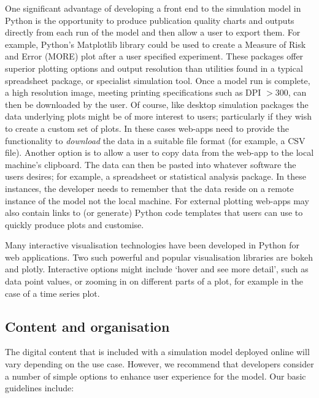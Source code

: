 \documentclass{swpaperproc}
\theoremstyle{sw}
\begin{document}
One significant advantage of developing a front end to the simulation model in Python is the opportunity to produce publication quality charts and outputs directly from each run of the model and then allow a user to export them.  For example, Python's Matplotlib library could be used to create a Measure of Risk and Error (MORE) plot after a user specified experiment. These packages offer superior plotting options and output resolution than utilities found in a typical spreadsheet package, or specialist simulation tool. Once a model run is complete, a high resolution image, meeting printing specifications such as DPI $> 300$, can then be downloaded by the user.  Of course, like desktop simulation packages the data underlying plots might be of more interest to users; particularly if they wish to create a custom set of plots.  In these cases web-apps need to provide the functionality to \textit{download} the data in a suitable file format (for example, a CSV file).  Another option is to allow a user to copy data from the web-app to the local machine's clipboard.  The data can then be pasted into whatever software the users desires; for example, a spreadsheet or statistical analysis package.  In these instances, the developer needs to remember that the data reside on a remote instance of the model not the local machine. For external plotting web-apps may also contain links to (or generate) Python code templates that users can use to quickly produce plots and customise.


Many interactive visualisation technologies have been developed in Python for web applications.  Two such powerful and popular visualisation libraries are bokeh and plotly.  Interactive options might include `hover and see more detail', such as data point values, or zooming in on different parts of a plot, for example in the case of a time series plot.
    
\subsection{Content and organisation}
 
The digital content that is included with a simulation model deployed online will vary depending on the use case.  However, we recommend that developers consider a number of simple options to enhance user experience for the model.  Our basic guidelines include:
\end{document}
